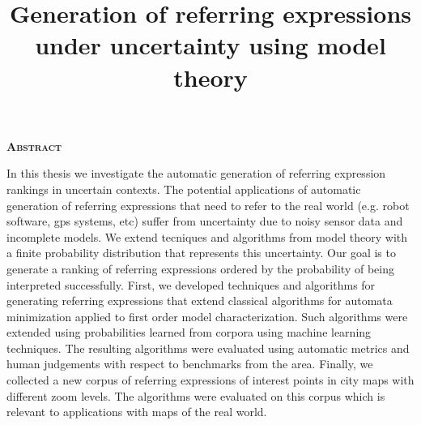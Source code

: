 \begin{center}

{ \vspace*{1cm} }
\huge{\textbf{\textsc{\textmd{Abstract}}}}\\[1cm]

\end{center}

\title{Generation of referring expressions under uncertainty using model theory}

\normalsize{In this thesis we investigate the automatic generation of referring expression rankings in uncertain contexts. The potential applications of automatic generation of referring expressions that need to refer to the real world (e.g. robot software, gps systems, etc) suffer from uncertainty due to noisy sensor data and incomplete models. We extend tecniques and algorithms from model theory with a finite probability distribution that represents this uncertainty. Our goal is to generate a ranking of referring expressions ordered by the probability of being interpreted successfully. First, we developed techniques and algorithms for generating referring expressions that extend classical algorithms for automata minimization applied to first order model characterization. Such algorithms were extended using probabilities learned from corpora using machine learning techniques. The resulting algorithms were evaluated using automatic metrics  and human judgements with respect to benchmarks from the area. Finally, we collected a new corpus of referring expressions of interest points in city maps with different zoom levels. The algorithms were evaluated on this corpus which is relevant to applications with maps of the real world.
}


